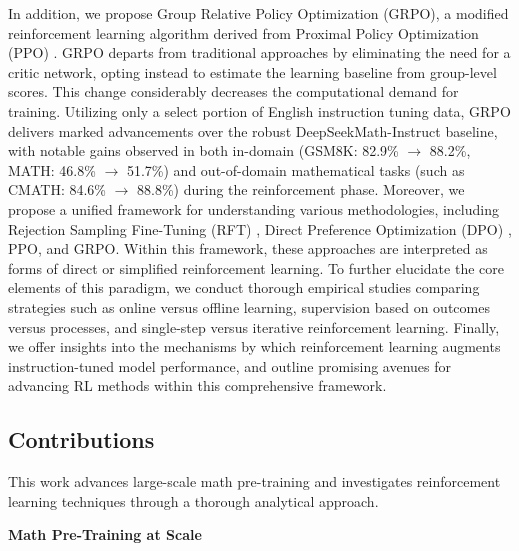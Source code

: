 In addition, we propose Group Relative Policy Optimization (GRPO), a modified reinforcement learning algorithm derived from Proximal Policy Optimization (PPO) \citep{schulman2017proximal}. GRPO departs from traditional approaches by eliminating the need for a critic network, opting instead to estimate the learning baseline from group-level scores. This change considerably decreases the computational demand for training. Utilizing only a select portion of English instruction tuning data, GRPO delivers marked advancements over the robust DeepSeekMath-Instruct baseline, with notable gains observed in both in-domain (GSM8K: 82.9\% $\rightarrow$ 88.2\%, MATH: 46.8\% $\rightarrow$ 51.7\%) and out-of-domain mathematical tasks (such as CMATH: 84.6\% $\rightarrow$ 88.8\%) during the reinforcement phase. Moreover, we propose a unified framework for understanding various methodologies, including Rejection Sampling Fine-Tuning (RFT) \citep{yuan2023scaling}, Direct Preference Optimization (DPO) \citep{dpo}, PPO, and GRPO. Within this framework, these approaches are interpreted as forms of direct or simplified reinforcement learning. To further elucidate the core elements of this paradigm, we conduct thorough empirical studies comparing strategies such as online versus offline learning, supervision based on outcomes versus processes, and single-step versus iterative reinforcement learning. Finally, we offer insights into the mechanisms by which reinforcement learning augments instruction-tuned model performance, and outline promising avenues for advancing RL methods within this comprehensive framework.

\subsection{Contributions}
This work advances large-scale math pre-training and investigates reinforcement learning techniques through a thorough analytical approach.

\textbf{Math Pre-Training at Scale}

